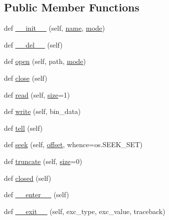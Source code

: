 \subsection*{Public Member Functions}
\begin{DoxyCompactItemize}
\item 
def \mbox{\hyperlink{classmavros_1_1ftp_1_1FTPFile_ab9ee82f1e229db08bfa039e2b7c53e45}{\+\_\+\+\_\+init\+\_\+\+\_\+}} (self, \mbox{\hyperlink{classmavros_1_1ftp_1_1FTPFile_a9aa7f5b38e225c1208000bb59ed089e8}{name}}, \mbox{\hyperlink{classmavros_1_1ftp_1_1FTPFile_a4ca55c2e19240b8792ea85f2ea7ff01a}{mode}})
\item 
def \mbox{\hyperlink{classmavros_1_1ftp_1_1FTPFile_aa4c3a31a020d032afb6ab23d60bd6b52}{\+\_\+\+\_\+del\+\_\+\+\_\+}} (self)
\item 
def \mbox{\hyperlink{classmavros_1_1ftp_1_1FTPFile_a3d38aa5af0f898e95939ac30e507a26b}{open}} (self, path, \mbox{\hyperlink{classmavros_1_1ftp_1_1FTPFile_a4ca55c2e19240b8792ea85f2ea7ff01a}{mode}})
\item 
def \mbox{\hyperlink{classmavros_1_1ftp_1_1FTPFile_a0ee10b7bd1ada00958549feb8ee64892}{close}} (self)
\item 
def \mbox{\hyperlink{classmavros_1_1ftp_1_1FTPFile_a5be56ce2d69a2218f265ebd06da8b87c}{read}} (self, \mbox{\hyperlink{classmavros_1_1ftp_1_1FTPFile_a375139e1ed26f06ca4a866626c888a09}{size}}=1)
\item 
def \mbox{\hyperlink{classmavros_1_1ftp_1_1FTPFile_aa1878b3e0aa7d10f58b443ad4e6351ce}{write}} (self, bin\+\_\+data)
\item 
def \mbox{\hyperlink{classmavros_1_1ftp_1_1FTPFile_a1eae7ed6dd89b65f0197b3fd347422b6}{tell}} (self)
\item 
def \mbox{\hyperlink{classmavros_1_1ftp_1_1FTPFile_a3fed06e798361b6267a1c06f6f76483e}{seek}} (self, \mbox{\hyperlink{classmavros_1_1ftp_1_1FTPFile_a9f517555ac2185b085474fbf6dea481f}{offset}}, whence=os.\+S\+E\+E\+K\+\_\+\+S\+ET)
\item 
def \mbox{\hyperlink{classmavros_1_1ftp_1_1FTPFile_a7d31a3943fa085489ad4c688c3870a10}{truncate}} (self, \mbox{\hyperlink{classmavros_1_1ftp_1_1FTPFile_a375139e1ed26f06ca4a866626c888a09}{size}}=0)
\item 
def \mbox{\hyperlink{classmavros_1_1ftp_1_1FTPFile_a8d93c57761c8b69342d3939718a5418e}{closed}} (self)
\item 
def \mbox{\hyperlink{classmavros_1_1ftp_1_1FTPFile_ab6e951ed4196f73fe9e56fd080cd2225}{\+\_\+\+\_\+enter\+\_\+\+\_\+}} (self)
\item 
def \mbox{\hyperlink{classmavros_1_1ftp_1_1FTPFile_a3455a85dc5cf2172788cda0687d91c0a}{\+\_\+\+\_\+exit\+\_\+\+\_\+}} (self, exc\+\_\+type, exc\+\_\+value, traceback)
\end{DoxyCompactItemize}
